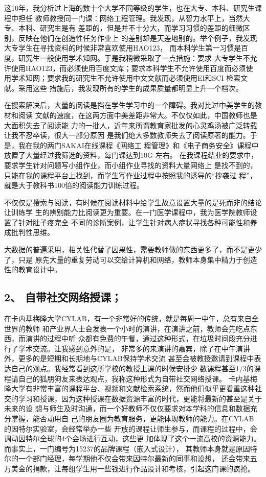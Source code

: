 \documentclass[11pt]{ctexart}
\begin{document}
{{{{这10年，我分析过上海的数十个大学不同等级的学生，也在大专、本科、研究生课程中担任
教师教授同一门课：网络工程管理。我发现，从智力水平上，当然大专、本科、研究生是有
差距的，但是并不十分大，而学习习惯的差距的细微区别，反映在他们在创造性任务作业上
的差别却是天差地别的。举个例子，我发现大专学生在寻找资料的时候非常喜欢使用HAO123，
而本科学生第一习惯是百度，研究生一般使用学术知网。于是我稍微采取了一点措施：要求
大专学生不允许使用HAO123，而必须使用百度文库；要求本科学生不允许使用百度而必须使
用学术知网；要求我的研究生不允许使用中文文献而必须使用EI和SCI 检索文献。采用这些
措施后，我发现所有的学生的成果质量都明显上升一个档次。

在搜索解决后，大量的阅读是挡在学生学习中的一个障碍。我对比过中美学生的教材和阅读
文献的速度，在这两方面中美差距非常大。不仅仅如此，中国教师也是大面积失去了阅读能
力的一批人，近年来所谓教育家批发的心灵鸡汤被广泛转载让我不忍卒读，很大一部分原因
是我们绝大多数教师失去了阅读原著的能力。于是，我在我的两门SAKAI在线课程《网络工
程管理》和《电子商务安全》课程中放置了大量经过我筛选的资料，每门课达到10G 左右。
在我课程结业的要求中，要求学生针对问题写小组作业，而小组作业寻找的资料大量网络上
是找不到的，只能在我的课程平台上找到，而学生写作业过程中按照我的诱导的“抄袭过
程”，就是大于教科书100倍的阅读能力训练过程。

不仅仅是搜索与阅读，有时候在阅读材料中给学生故意设置大量的是死而非的结论让训练学
生的辨别能力比阅读更为重要。在一门医学课程中，我为医学院教师设置了针对肚子疼完全
不同的诊断案例，让学生针对病人症状寻找各种可能性和养成批判性思维。

大数据的普遍采用，相关性代替了因果性，需要教师做的东西更多了，而不是更少了，只是
原先大量的重复劳动可以交给计算机和网络，教师本身集中精力于创造性的教育设计中。

\subsection{2、 自带社交网络授课；}
\label{sec:org0044ce4}
在卡内基梅隆大学CYLAB，有一个非常好的传统，就是每周一中午，总有来自全世界的教师
和产业界人士会发表一个小时的演讲，在演讲之前，教师会先吃点东西，而演讲的过程中听
众都有免费的午餐，通过这种形式，在垃圾时间段充分进行了学术交流。让我感到意外的是，
非常多的来演讲的嘉宾，除了在中午演讲外，更多的是短期和长期地与CYLAB保持学术交流
甚至会被教授邀请到课程中表达自己的观点。我经常看到这所学校的教授上课的时候安排少
数课程甚至1/3的课程请自己的狐朋狗友来表达观点，我称这种形式为自带社交网络授课。
卡内基梅隆大学有非常丰富的课程平台、视频和文献检索系统，然而他们似乎更看重这种社
交的学习和授课，因为这种授课在数据资源丰富的时代，更能将最新的甚至是关于未来的设
想与师生及时沟通，而一个好教师不仅仅要求对本学科的信息和数据充分掌握，能否动用自
己的朋友圈为教育服务，更能体现教师的能力。在CYLAB 的因特尔实验室，会经常举办一些
开放的课程让师生参与，而课程的过程中，会调动因特尔全球的4个会场进行互动，这些更
加体现了这个一流高校的资源能力。而事实上，一门编号为15237的品牌课程（嵌入式设计），
其教师本身就是原因特尔的一个部门经理，每学期他不仅会带来因特尔最新的同事和设想，
还会带来五万美金的捐款，让每组学生用一些钱进行作品设计和考核，引起这门课的疯抢。

}}}}
\end{document}
